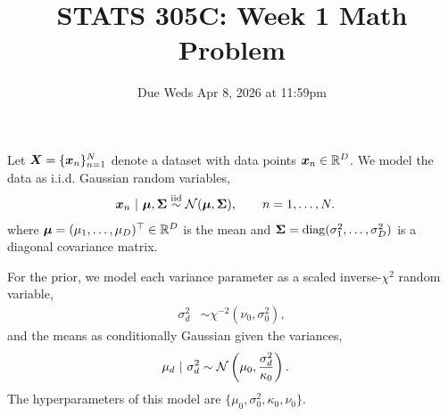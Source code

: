 \documentclass[11pt]{article}
\title{STATS 305C: Week 1 Math Problem}
\date{Due Weds Apr 8, 2026 at 11:59pm}
\begin{document}
\maketitle

\noindent
Let $\boldsymbol{X}=\{\boldsymbol{x}_{n}\}_{n=1}^{N}$ denote a dataset with data points $\boldsymbol{x}_{n} \in \mathbb{R}^D$. 
We model the data as i.i.d. Gaussian random variables,
\begin{align*}
    \boldsymbol{x}_{n} ~\vert~ \boldsymbol{\mu}, \boldsymbol{\Sigma} &\stackrel{\text{iid}}{\sim} \mathcal{N}(\boldsymbol{\mu}, \boldsymbol{\Sigma}), \qquad n=1,\dots,N.
\end{align*}
where $\boldsymbol{\mu} = (\mu_1,\dots,\mu_D)^\top \in \mathbb{R}^D$ is the mean and $\boldsymbol{\Sigma} = \mathrm{diag}(\sigma_{1}^2,\dots,\sigma_{D}^2)$ is a diagonal covariance matrix.

For the prior, we model each variance parameter as a scaled inverse-$\chi^2$ random variable,
\begin{align*}
    \sigma_{d}^2 &\sim \chi^{-2}(\nu_0, \sigma_0^2),
\end{align*}
and the means as conditionally Gaussian given the variances,
\begin{align*}
    \mu_{d} ~\vert~ \sigma_{d}^2 &\sim \mathcal{N}\left(\mu_0, \frac{\sigma_{d}^2}{\kappa_{0}}\right).
\end{align*}
The hyperparameters of this model are $\{\mu_{0}, \sigma_{0}^2, \kappa_{0}, \nu_{0}\}$.
\end{document}
